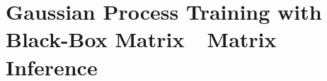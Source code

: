 \chapter{Gaussian Process Training with Black-Box Matrix~\texttimes~Matrix Inference}
\label{chapter:bbmm}








%

%

%

%
